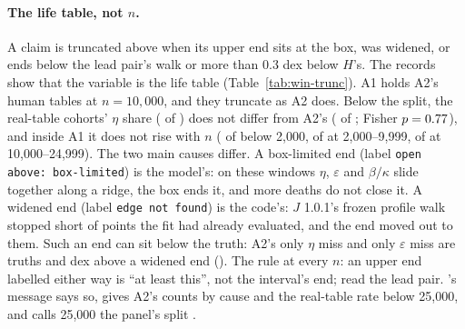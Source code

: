 \paragraph{The life table, not $n$.} A claim is truncated above when its upper end sits at the
box, was widened, or ends below the lead pair's walk or more than 0.3 dex below $H$'s. The records show that the variable
is the life table (Table~\ref{tab:win-trunc}). A1 holds A2's human tables at $n=10{,}000$, and they truncate as A2 does.
Below the split, the real-table cohorts' $\eta$ share ( of ) does not differ from A2's ( of ; Fisher
$p=\verify{specs/006-calibrator-capabilities/review/evidence/windows_counts_006.json}{truncation.fisher_p_eta_a1_real_vs_a2}{.2f}{0.77}$), and inside A1 it does not rise with $n$ ( of  below 2{,}000,  of  at 2{,}000--9{,}999,  of  at
10{,}000--24{,}999). The two main causes differ. A box-limited end (label \texttt{open above: box-limited}) is the
model's: on these windows $\eta$, $\varepsilon$ and $\beta/\kappa$ slide together along a ridge, the box ends it, and more
deaths do not close it. A widened end (label \texttt{edge not found}) is the code's: $J$ 1.0.1's frozen profile walk
stopped short of points the fit had already evaluated, and the end moved out to them. Such an end can sit below the
truth: A2's only $\eta$ miss and only $\varepsilon$ miss are truths  and  dex above a widened end
(). The rule at every $n$: an upper end labelled either way is ``at least
this'', not the interval's end; read the lead pair. 's message says so, gives A2's counts by cause and
the real-table rate below 25{,}000, and calls 25{,}000 the panel's split .

